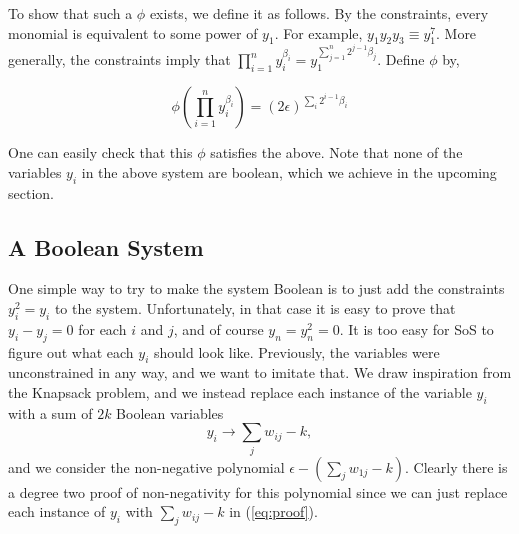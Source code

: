 To show that such a $\phi$ exists, we define it as follows. By the constraints, every monomial is equivalent to some power of $y_1$. For example, $y_1y_2y_3 \equiv y_1^7$.  More generally, the constraints imply that $\prod_{i = 1}^n y_i^{\beta_i} = y_1^{\sum_{j = 1}^n 2^{j-1} \beta_j}$.  Define $\phi$ by,

\[\phi\left( \prod_{i = 1}^n y_i^{\beta_i}\right) = (2\epsilon)^{\sum_{i} 2^{i-1} \beta_i } \]

One can easily check that this $\phi$ satisfies the above. Note that none of the variables $y_i$ in the above system are boolean, which we achieve in the upcoming section.
 
\subsection{A Boolean System}
One simple way to try to make the system Boolean is to just add the constraints $y_i^2 = y_i$ to the system. Unfortunately, in that case it is easy to prove that $y_i - y_j = 0$ for each $i$ and $j$, and of course $y_n = y_n^2 = 0$. It is too easy for SoS to figure out what each $y_i$ should look like. Previously, the variables were unconstrained in any way, and we want to imitate that. We draw inspiration from the Knapsack problem, and we instead replace each instance of the variable $y_i$ with a sum of $2k$ Boolean variables 
\[y_i \rightarrow \sum_j w_{ij} - k,\] 
and we consider the non-negative polynomial $\epsilon - (\sum_j w_{1j} - k)$. Clearly there is a degree two proof of non-negativity for this polynomial since we can just replace each instance of $y_i$ with $\sum_j w_{ij} - k$ in (\ref{eq:proof}). 

